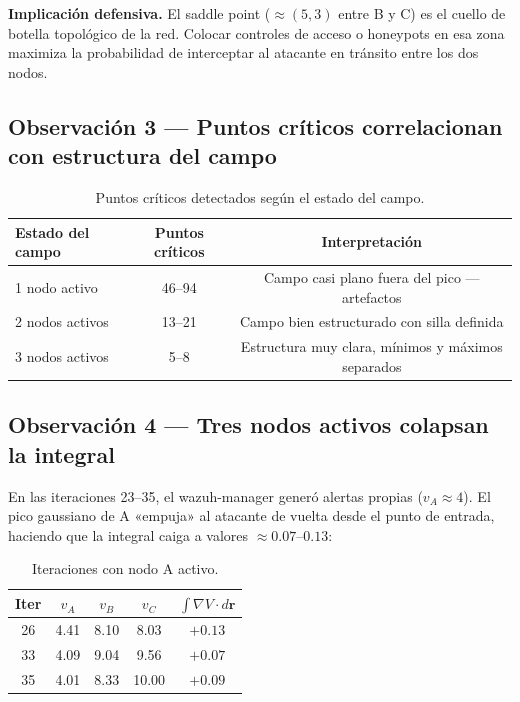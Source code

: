 \documentclass[12pt,a4paper]{article}
\newcommand{\grad}{\nabla}
\begin{document}
\begin{tcolorbox}[defbox]
  \textbf{Implicación defensiva.} El saddle point ($\approx (5,3)$
  entre B y C) es el cuello de botella topológico de la red. Colocar
  controles de acceso o honeypots en esa zona maximiza la probabilidad
  de interceptar al atacante en tránsito entre los dos nodos.
\end{tcolorbox}

\subsection{Observación 3 --- Puntos críticos correlacionan con estructura del campo}

\begin{table}[H]
  \centering
  \caption{Puntos críticos detectados según el estado del campo.}
  \begin{tabular}{@{}lcc@{}}
    \toprule
    Estado del campo & Puntos críticos & Interpretación \\
    \midrule
    1 nodo activo   & 46--94 & Campo casi plano fuera del pico --- artefactos \\
    2 nodos activos & 13--21 & Campo bien estructurado con silla definida \\
    3 nodos activos & 5--8   & Estructura muy clara, mínimos y máximos separados \\
    \bottomrule
  \end{tabular}
\end{table}

\subsection{Observación 4 --- Tres nodos activos colapsan la integral}

En las iteraciones 23--35, el wazuh-manager generó alertas propias
($v_A \approx 4$). El pico gaussiano de A «empuja» al atacante de
vuelta desde el punto de entrada, haciendo que la integral caiga a
valores $\approx 0.07$--$0.13$:

\begin{table}[H]
  \centering
  \caption{Iteraciones con nodo A activo.}
  \begin{tabular}{@{}ccccc@{}}
    \toprule
    Iter & $v_A$ & $v_B$ & $v_C$ & $\int\grad V\cdot d\mathbf{r}$ \\
    \midrule
    26 & 4.41 & 8.10 &  8.03 & $+0.13$ \\
    33 & 4.09 & 9.04 &  9.56 & $+0.07$ \\
    35 & 4.01 & 8.33 & 10.00 & $+0.09$ \\
    \bottomrule
  \end{tabular}
\end{table}
\end{document}
